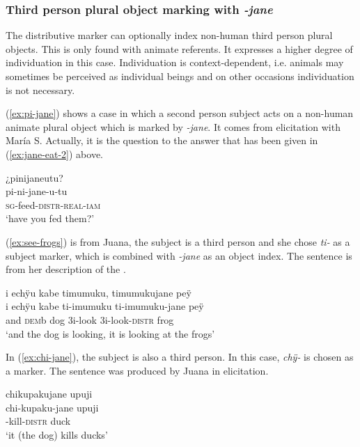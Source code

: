 \subsubsection{Third person plural object marking with \textit{-jane}} The distributive marker can optionally index non-human third person plural objects. This is only found with animate referents. It expresses a higher degree of individuation in this case. Individuation is context-dependent, i.e. animals may sometimes be perceived as individual beings and on other occasions individuation is not necessary.
 
(\ref{ex:pi-jane}) shows a case in which a second person subject acts on a non-human animate plural object which is marked by \textit{-jane}. It comes from elicitation with María S. Actually, it is the question to the answer that has been given in (\ref{ex:jane-eat-2}) above.
 
 \ea\label{ex:pi-jane}
\begingl 
\glpreamble ¿pinijaneutu?\\
\gla pi-ni-jane-u-tu\\ 
\textsc{sg}-feed-\textsc{distr}-\textsc{real}-\textsc{iam}\\ 
\glft ‘have you fed them?’\\ 
\endgl
\trailingcitation{[rxx-e141230s.037]}
\xe

(\ref{ex:see-frogs}) is from Juana, the subject is a third person and she chose \textit{ti-} as a subject marker, which is combined with \textit{-jane} as an object index. The sentence is from her description of the .

\ea\label{ex:see-frogs}
\begingl
\glpreamble i echÿu kabe timumuku, timumukujane peÿ\\
\gla i echÿu kabe ti-imumuku ti-imumuku-jane peÿ\\
\glb and \textsc{dem}b dog 3i-look 3i-look-\textsc{distr} frog\\
\glft ‘and the dog is looking, it is looking at the frogs’
\endgl
\trailingcitation{[jxx-a120516l-a.429]}
\xe

In (\ref{ex:chi-jane}), the subject is also a third person. In this case, \textit{chÿ-} is chosen as a marker. The sentence was produced by Juana in elicitation.

\ea\label{ex:chi-jane}
\begingl 
\glpreamble chikupakujane upuji\\
\gla chi-kupaku-jane upuji\\ 
-kill-\textsc{distr} duck\\ 
\glft ‘it (the dog) kills ducks’\\ 
\endgl
\trailingcitation{[jxx-e081025s-1.552]}
\xe



